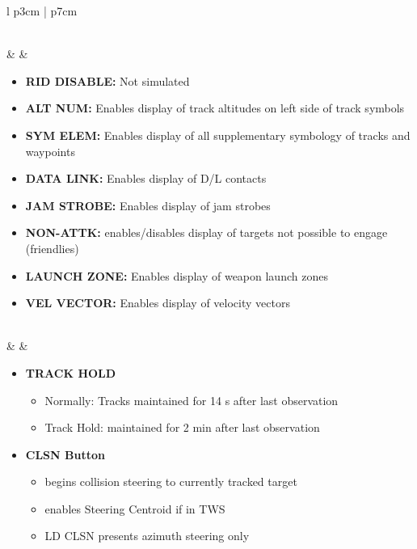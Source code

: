 \documentclass[8pt,usenames,dvipsnames,twoside]{article}
\begin{document}
\begin{center}
\begin{longtable}{l p{3cm} | p{7cm}}
\begin{minipage}[t]{\linewidth}
\begin{itemize}
					\end{itemize}
				\end{minipage} \\
				\midrule
				\textbullet &  & 
				\begin{minipage}[t]{\linewidth}
					\vspace{-7pt}
					\begin{itemize}
						\item \textbf{RID DISABLE:} Not simulated
						\item \textbf{ALT NUM:} Enables display of track altitudes on left side of track symbols
						\item \textbf{SYM ELEM:} Enables display of all supplementary symbology of tracks and waypoints
						\item \textbf{DATA LINK:} Enables display of D/L contacts
						\item \textbf{JAM STROBE:} Enables display of jam strobes
						\item \textbf{NON-ATTK:} enables/disables display of targets not possible to engage (friendlies)
						\item \textbf{LAUNCH ZONE:} Enables display of weapon launch zones
						\item \textbf{VEL VECTOR:} Enables display of velocity vectors
					\end{itemize}
				\end{minipage} \\
				\midrule
				\textbullet &  & 
				\begin{minipage}[t]{\linewidth}
					\vspace{-7pt}
					\begin{itemize}
						\item \textbf{TRACK HOLD} 
						\begin{itemize}
							\item Normally: Tracks maintained for 14 s after last observation
							\item Track Hold: maintained for 2 min after last observation
						\end{itemize}
						\item \textbf{CLSN Button} 
						\begin{itemize}
							\item begins collision steering to currently tracked target
							\item enables Steering Centroid if in TWS
							\item LD CLSN presents azimuth steering only

\end{itemize}
\end{itemize}
\end{minipage}
\end{longtable}
\end{center}
\end{document}
